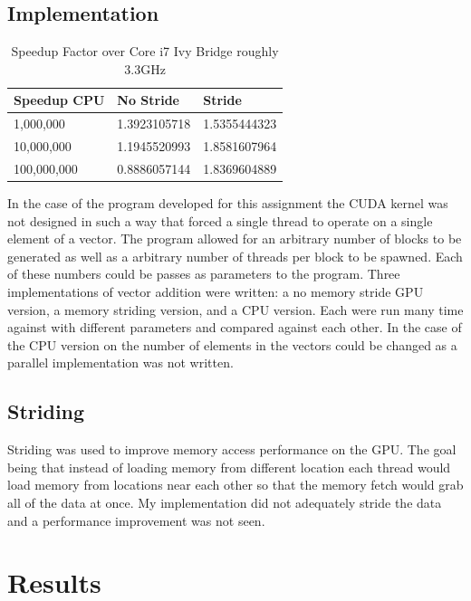 \documentclass[letterpaper,twocolumn]{article}
\begin{document}
\subsection{Implementation}
\begin{table}
\centering
\begin{tabular}[t]{|l|l|l|} \hline
Speedup CPU & No Stride & Stride\\ \hline
1,000,000 & 1.3923105718 & 1.5355444323\\ \hline
10,000,000 & 1.1945520993 & 1.8581607964\\ \hline
100,000,000 & 0.8886057144 & 1.8369604889 \\ \hline
\end{tabular}
\caption{Speedup Factor over Core i7 Ivy Bridge roughly 3.3GHz}
\end{table}
In the case of the program developed for this assignment the CUDA kernel was not designed in such a way that forced a single thread to operate on a single element of a vector. The program allowed for an arbitrary number of blocks to be generated as well as a arbitrary number of threads per block to be spawned. Each of these numbers could be passes as parameters to the program. Three implementations of vector addition were written: a no memory stride GPU version, a memory striding version, and a CPU version. Each were run many time against with different parameters and compared against each other. In the case of the CPU version on the number of elements in the vectors could be changed as a parallel implementation was not written.
\subsection{Striding}
Striding was used to improve memory access performance on the GPU. The goal being that instead of loading memory from different location each thread would load memory from locations near each other so that the memory fetch would grab all of the data at once. My implementation did not adequately stride the data and a performance improvement was not seen.

\section{Results}
\end{document}
